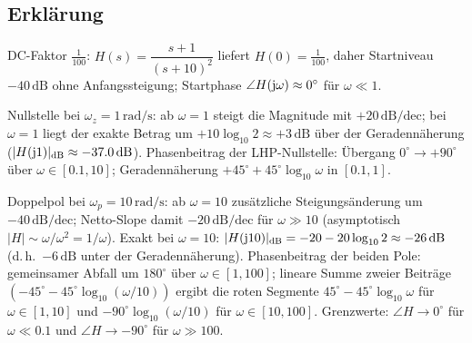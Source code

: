 \begin{center}
\end{center}
\newpage
\subsection{Erklärung}
\vspace{5mm}
\begin{description}[leftmargin=1.2em,labelsep=.6em,font=\bfseries]
\item[Schritt 1] DC-Faktor $\frac{1}{100}$: $H(s)=\dfrac{s+1}{(s+10)^2}$ liefert $H(0)=\tfrac{1}{100}$, daher Startniveau $-40\,\mathrm{dB}$ ohne Anfangssteigung; Startphase $\angle H(\operatorname{j}\!\omega)\approx0^\circ$ für $\omega\ll1$.
\item[Schritt 2] Nullstelle bei $\omega_z=1\,\mathrm{rad/s}$: ab $\omega=1$ steigt die Magnitude mit $+20\,\mathrm{dB/dec}$; bei $\omega=1$ liegt der exakte Betrag um $+10\log_{10}2\approx+3\,\mathrm{dB}$ über der Geradennäherung ($|H(\operatorname{j}\!1)|_{\mathrm{dB}}\approx-37.0\,\mathrm{dB}$). Phasenbeitrag der LHP-Nullstelle: Übergang $0^\circ\to+90^\circ$ über $\omega\in[0.1,10]$; Geradennäherung $+45^\circ+45^\circ\log_{10}\omega$ in $[0.1,1]$.
\item[Schritt 3] Doppelpol bei $\omega_p=10\,\mathrm{rad/s}$: ab $\omega=10$ zusätzliche Steigungsänderung um $-40\,\mathrm{dB/dec}$; Netto-Slope damit $-20\,\mathrm{dB/dec}$ für $\omega\gg10$ (asymptotisch $|H|\sim \omega/\omega^2=1/\omega$). Exakt bei $\omega=10$: $|H(\operatorname{j}\!10)|_{\mathrm{dB}}=-20-20\log_{10}2\approx-26\,\mathrm{dB}$ (d.\,h.\ $-6\,\mathrm{dB}$ unter der Geradennäherung). Phasenbeitrag der beiden Pole: gemeinsamer Abfall um $180^\circ$ über $\omega\in[1,100]$; lineare Summe zweier Beiträge $(-45^\circ-45^\circ\log_{10}(\omega/10))$ ergibt die roten Segmente $45^\circ-45^\circ\log_{10}\omega$ für $\omega\in[1,10]$ und $-90^\circ\log_{10}(\omega/10)$ für $\omega\in[10,100]$. Grenzwerte: $\angle H\to0^\circ$ für $\omega\ll0.1$ und $\angle H\to-90^\circ$ für $\omega\gg100$.
\end{description}

